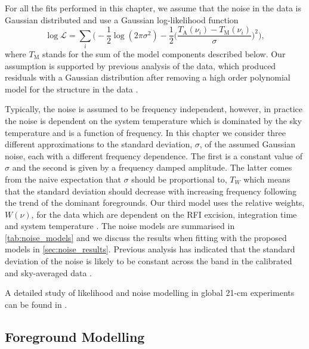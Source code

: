For all the fits performed in this chapter, we assume that the noise in the data is Gaussian distributed and use a Gaussian log-likelihood function
\begin{equation}
    \log\mathcal{L} = \sum_i \bigg(-\frac{1}{2}\log(2\pi\sigma^2) -\frac{1}{2}\bigg(\frac{T_\mathrm{A}(\nu_i) - T_\mathrm{M}(\nu_i)}{\sigma}\bigg)^2\bigg),
    \label{eq:likelihood}
\end{equation}
where $T_\mathrm{M}$ stands for the sum of the model components described below. %
Our assumption is supported by previous analysis of the data, which produced residuals with a Gaussian distribution after removing a high order polynomial model for the structure in the data \citep[see][]{Singh_saras2_2017, Bevins_SARAS2_2022}.

Typically, the noise is assumed to be frequency independent, however, in practice the noise is dependent on the system temperature which is dominated by the sky temperature and is a function of frequency. In this chapter we consider three different approximations to the standard deviation, $\sigma$, of the assumed Gaussian noise, each with a different frequency dependence. The first is a constant value of $\sigma$ and the second is given by a frequency damped amplitude. The latter comes from the naive expectation that $\sigma$ should be proportional to, $T_W$ which means that the standard deviation should decrease with increasing frequency following the trend of the dominant foregrounds. Our third model uses the relative weights, $W(\nu)$, for the data which are dependent on the RFI excision, integration time and system temperature \citep[see Fig. 4 in ][]{Singh_saras2_2018}. The noise models are summarised in \cref{tab:noise_models} and we discuss the results when fitting with the proposed models in \cref{sec:noise_results}. Previous analysis has indicated that the standard deviation of the noise is likely to be constant across the band in the calibrated and sky-averaged data \citep{Singh_saras2_2017, Singh_saras2_2018}.

A detailed study of likelihood and noise modelling in global 21-cm experiments can be found in \cite{Scheutwinkel2022a}.

\subsection{Foreground Modelling}


